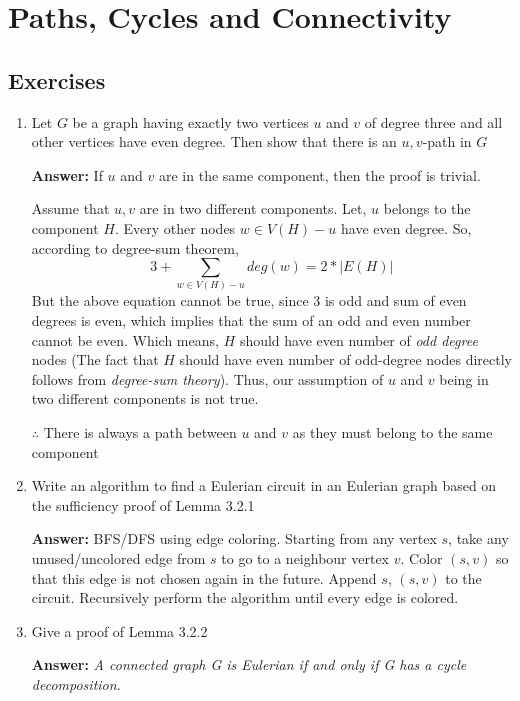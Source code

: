 \chapter{Paths, Cycles and Connectivity}\label{ch3}
\section{Exercises}

\begin{enumerate}
    \item {
        Let $G$ be a graph having exactly two vertices $u$ and $v$ of degree three and all other vertices have even degree. Then show that there is an $u, v$-path in $G$ 
        
        \textbf{Answer: } If $u$ and $v$ are in the same component, then the proof is trivial. 
        
        Assume that $u, v$ are in two different components. Let, $u$ belongs to the component $H$. Every other nodes $w \in V(H)-u$ have even degree. So, according to degree-sum theorem, 
        \[ 3 + \sum_{w \in V(H)-u} deg(w) = 2*|E(H)| \]
        But the above equation cannot be true, since $3$ is odd and sum of even degrees is even, which implies that the sum of an odd and even number cannot be even. Which means, $H$ should have even number of \textit{odd degree} nodes (The fact that $H$ should have even number of odd-degree nodes directly follows from \textit{degree-sum theory}). Thus, our assumption of $u$ and $v$ being in two different components is not true.
        
        $\therefore$ There is always a path between $u$ and $v$ as they must belong to the same component
    }
    \item {
        Write an algorithm to find a Eulerian circuit in an Eulerian graph based on the sufficiency proof of Lemma 3.2.1
        
        \textbf{Answer:} BFS/DFS using edge coloring. Starting from any vertex $s$, take any unused/uncolored edge from $s$ to go to a neighbour vertex $v$. Color $(s,v)$ so that this edge is not chosen again in the future. Append $s$, $(s,v)$ to the circuit. Recursively perform the algorithm until every edge is colored.
    }
    \item {
        Give a proof of Lemma 3.2.2
        
        \textbf{Answer:} \textit{A connected graph G is Eulerian if and only if G has a cycle decomposition.}
        
}
\end{enumerate}
